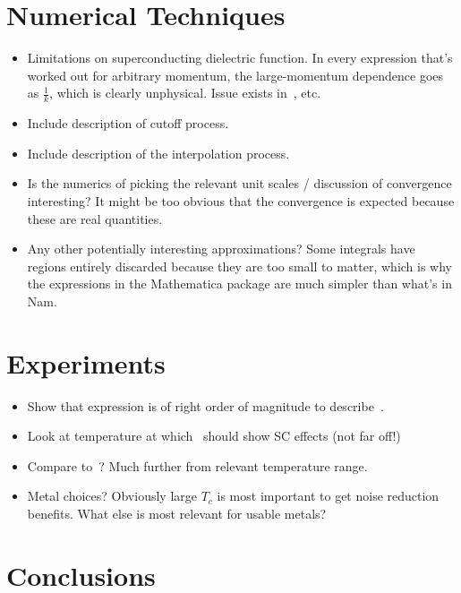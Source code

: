 \documentclass{article}
\begin{document}
\section{Numerical Techniques \label{sec:technical}}

\begin{itemize}
	\item Limitations on superconducting dielectric function.
	In every expression that's worked out for arbitrary momentum, the large-momentum dependence goes as $\frac{1}{k}$, which is clearly unphysical.
	Issue exists in~\cite{Nam1967, AGD, Tinkham}, etc.
	\item Include description of cutoff process.
	\item Include description of the interpolation process.
	\item Is the numerics of picking the relevant unit scales / discussion of convergence interesting?
	It might be too obvious that the convergence is expected because these are real quantities.
	\item Any other potentially interesting approximations?
	Some integrals have regions entirely discarded because they are too small to matter, which is why the expressions in the Mathematica package are much simpler than what's in Nam.
\end{itemize}

\section{Experiments \label{sec:experiments}}
\begin{itemize}
	\item Show that expression is of right order of magnitude to describe~\cite{Tenberg2019}.
	\item Look at temperature at which~\cite{Tenberg2019} should show SC effects (not far off!)
	\item Compare to~\cite{Kolkowitz2015}?
	Much further from relevant temperature range.
	\item Metal choices?
	Obviously large $T_c$ is most important to get noise reduction benefits.
	What else is most relevant for usable metals?
\end{itemize}
\section{Conclusions \label{sec:conclusions}}

\printbibliography
\end{document}
